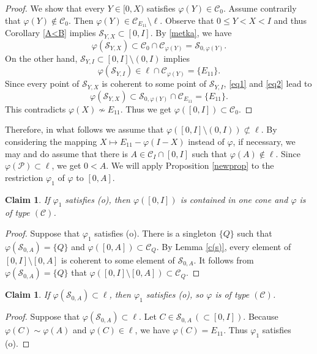 \documentclass[10pt]{amsart}
\newtheorem{claim}[theorem]{Claim}
\theoremstyle{definition}
\theoremstyle{remark}
\numberwithin{subsection}{section}
\numberwithin{equation}{section}
\newcommand\cC{{\mathcal{C}}}
\newcommand\cP{{\mathcal{P}}}
\begin{document}
\begin{proof}
We show that every $Y\in [0,X)$ satisfies $\varphi(Y)\in\mathcal{C}_0$. 
Assume contrarily that $\varphi(Y)\notin \mathcal{C}_0$.
Then $\varphi(Y)\in \mathcal{C}_{E_{11}}\setminus \ell$. 
Observe that $0\leq Y<X<I$ and thus Corollary \ref{A<B} implies $\mathcal{S}_{Y,X}\subset [0,I]$.
By \eqref{metka}, we have 
\begin{equation}\label{eq1}
\varphi(\mathcal{S}_{Y,X})\subset \mathcal{C}_0\cap \mathcal{C}_{\varphi(Y)}=\mathcal{S}_{0, \varphi(Y)}.
\end{equation}
On the other hand, $\mathcal{S}_{Y, I}\subset [0, I]\setminus (0, I)$ implies
\begin{equation}\label{eq2}
\varphi(\mathcal{S}_{Y, I})\in \ell \cap \mathcal{C}_{\varphi(Y)} = \{E_{11}\}.
\end{equation}
Since every point of $\mathcal{S}_{Y, X}$ is coherent to some point of $\mathcal{S}_{Y, I}$,   \eqref{eq1} and \eqref{eq2} lead to 
\[
\varphi(\mathcal{S}_{Y, X})\subset \mathcal{S}_{0, \varphi(Y)}\cap \cC_{E_{11}} = \{E_{11}\}.
\]
This contradicts $\varphi(X)\not\sim E_{11}$.
Thus we get $\varphi([0,I])\subset \cC_0$.
\end{proof}


Therefore, in what follows we assume that $\varphi([0, I]\setminus(0,I))\not\subset \ell$.
By considering the mapping $X\mapsto E_{11}-\varphi(I-X)$ instead of $\varphi$, if necessary, we may and do assume that there is $A\in \cC_I\cap [0, I]$ such that $\varphi(A)\notin \ell$.
Since $\varphi(\cP)\subset \ell$, we get $0<A$.
We will apply Proposition \ref{newprop} to the restriction $\varphi_1$ of $\varphi$ to $[0, A]$.


\begin{claim}
If $\varphi_1$ satisfies (o), then $\varphi([0,I])$ is contained in one cone and $\varphi$ is of type $(\mathcal{C})$.
\end{claim}
\begin{proof}
Suppose that $\varphi_1$ satisfies (o).
There is a singleton $\{ Q \}$ such that $\varphi (\mathcal{S}_{0,A}) = \{ Q \}$ and $\varphi ([0,A]) \subset \mathcal{C}_{Q}$. 
By Lemma \ref{c(s)}, every element of $[0,I] \setminus [0, A]$ is coherent to some element of $\mathcal{S}_{0,A}$. 
It follows from $\varphi (\mathcal{S}_{0,A}) = \{ Q \}$ that $\varphi([0,I] \setminus [0, A]) \subset \mathcal{C}_{Q}$.
\end{proof}



\begin{claim}\label{oc}
If $\varphi(\mathcal{S}_{0, A})\subset \ell$, then $\varphi_1$ satisfies (o), so $\varphi$ is of type $(\mathcal{C})$.
\end{claim}
\begin{proof}
Suppose that $\varphi(\mathcal{S}_{0, A})\subset \ell$. 
Let $C \in \mathcal{S}_{0, A} \,(\subset [0,I])$. 
Because $\varphi (C) \sim \varphi (A)$ and $\varphi (C) \in \ell$, we have $\varphi (C) = E_{11}$. 
Thus $\varphi_1$ satisfies (o).
\end{proof}
\end{document}
